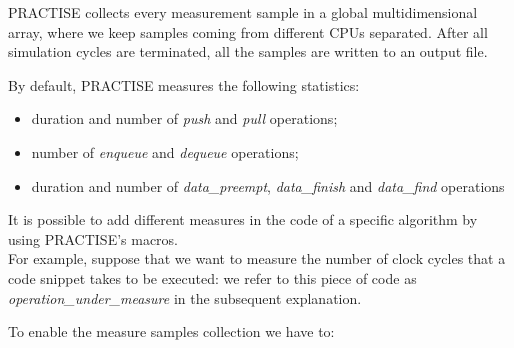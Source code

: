 PRACTISE collects every measurement sample in a global multidimensional array, where we keep samples coming
from different CPUs separated. After all simulation cycles are terminated, all the samples are written to
an output file.

By default, PRACTISE measures the following statistics:

\begin{itemize}
\item duration and number of \emph{push} and \emph{pull} operations;
\item number of \emph{enqueue} and \emph{dequeue} operations;
\item duration and number of \emph{data\_preempt}, \emph{data\_finish} and \emph{data\_find} operations
\end{itemize}

It is possible to add different measures in the code of a specific algorithm by using PRACTISE's macros.\\
For example, suppose that we want to measure the number of clock cycles that a code snippet takes to be
executed: we refer to this piece of code as \emph{operation\_under\_measure} in the subsequent
explanation.

To enable the measure samples collection we have to:

